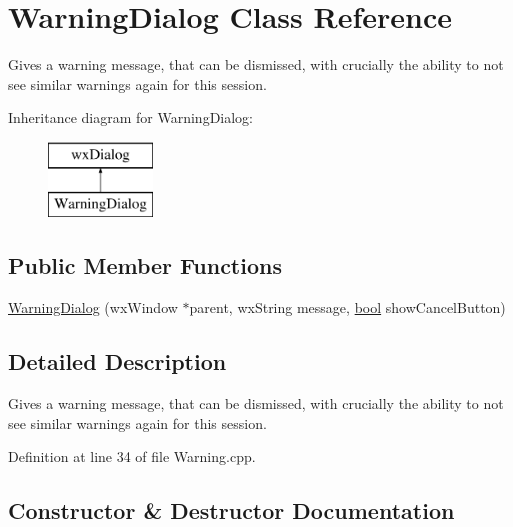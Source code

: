 \hypertarget{class_warning_dialog}{}\section{Warning\+Dialog Class Reference}
\label{class_warning_dialog}


Gives a warning message, that can be dismissed, with crucially the ability to not see similar warnings again for this session.  


Inheritance diagram for Warning\+Dialog\+:\begin{figure}[H]
\begin{center}
\leavevmode
\includegraphics[height=2.000000cm]{class_warning_dialog}
\end{center}
\end{figure}
\subsection*{Public Member Functions}
\begin{DoxyCompactItemize}
\item 
\hyperlink{class_warning_dialog_a3de9e0f71f28abd965f2b0e05f2690cf}{Warning\+Dialog} (wx\+Window $\ast$parent, wx\+String message, \hyperlink{mac_2config_2i386_2lib-src_2libsoxr_2soxr-config_8h_abb452686968e48b67397da5f97445f5b}{bool} show\+Cancel\+Button)
\end{DoxyCompactItemize}


\subsection{Detailed Description}
Gives a warning message, that can be dismissed, with crucially the ability to not see similar warnings again for this session. 

Definition at line 34 of file Warning.\+cpp.



\subsection{Constructor \& Destructor Documentation}
